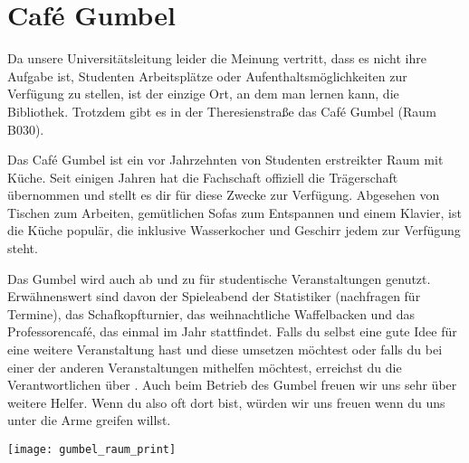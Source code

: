 
\chapter{Café Gumbel}

Da unsere Universitätsleitung leider die Meinung vertritt, dass es nicht ihre
Aufgabe ist, Studenten Arbeitsplätze oder Aufenthaltsmöglichkeiten zur Verfügung
zu stellen, ist der einzige Ort, an dem man lernen kann, die Bibliothek.
Trotzdem gibt es in der Theresienstraße das Café Gumbel (Raum B030).

Das Café Gumbel ist ein vor Jahrzehnten von Studenten erstreikter Raum mit
Küche. Seit einigen Jahren hat die Fachschaft offiziell die Trägerschaft
übernommen und stellt es dir für diese Zwecke zur Verfügung. Abgesehen von
Tischen zum Arbeiten, gemütlichen Sofas zum Entspannen und einem Klavier,
ist die Küche populär, die inklusive Wasserkocher und
Geschirr jedem zur Verfügung steht.

Das Gumbel wird auch ab und zu für studentische Veranstaltungen genutzt.
Erwähnenswert sind davon der Spieleabend der Statistiker (nachfragen für
Termine), das Schafkopfturnier, das weihnachtliche Waffelbacken und das
Professorencafé, das einmal im Jahr stattfindet.  Falls du selbst eine
gute Idee für eine weitere Veranstaltung hast und diese umsetzen möchtest
oder falls du bei einer der anderen Veranstaltungen mithelfen möchtest,
erreichst du die Verantwortlichen über . Auch beim
Betrieb des Gumbel freuen wir uns sehr über weitere Helfer. Wenn du also
oft dort bist, würden wir uns freuen wenn du uns unter die Arme greifen willst.

\skiptobottom
\begin{center}
     \texttt{[image: gumbel\_raum\_print]}
\end{center}
